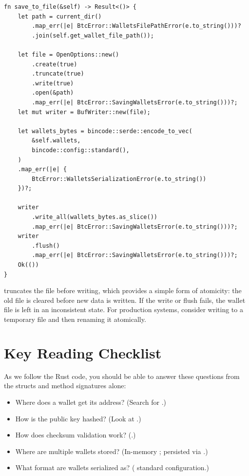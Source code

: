 \begin{listing}[htbp]
\caption{Saving wallets to disk ()}
\label{lst:ch14-save-wallets}
\begin{verbatim}
fn save_to_file(&self) -> Result<()> {
    let path = current_dir()
        .map_err(|e| BtcError::WalletsFilePathError(e.to_string()))?
        .join(self.get_wallet_file_path());

    let file = OpenOptions::new()
        .create(true)
        .truncate(true)
        .write(true)
        .open(&path)
        .map_err(|e| BtcError::SavingWalletsError(e.to_string()))?;
    let mut writer = BufWriter::new(file);

    let wallets_bytes = bincode::serde::encode_to_vec(
        &self.wallets,
        bincode::config::standard(),
    )
    .map_err(|e| {
        BtcError::WalletsSerializationError(e.to_string())
    })?;

    writer
        .write_all(wallets_bytes.as_slice())
        .map_err(|e| BtcError::SavingWalletsError(e.to_string()))?;
    writer
        .flush()
        .map_err(|e| BtcError::SavingWalletsError(e.to_string()))?;
    Ok(())
}
\end{verbatim}
\end{listing}

\begin{notebox}
 truncates the file before writing, which provides a simple form of atomicity: the old file is cleared before new data is written. If the write or flush fails, the wallet file is left in an inconsistent state. For production systems, consider writing to a temporary file and then renaming it atomically.
\end{notebox}

\section{Key Reading Checklist}
\label{sec:wallet-reading-checklist}

As we follow the Rust code, you should be able to answer these questions from the structs and method signatures alone:

\begin{itemize}
  \item Where does a wallet get its address? (Search for .)
  \item How is the public key hashed? (Look at .)
  \item How does checksum validation work? (.)
  \item Where are multiple wallets stored? (In-memory ; persisted via .)
  \item What format are wallets serialized as? ( standard configuration.)
\end{itemize}

